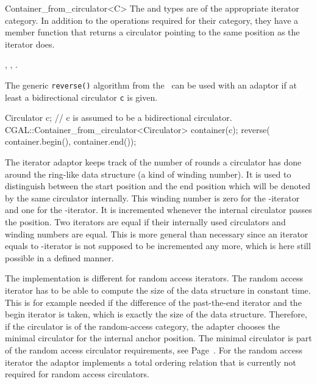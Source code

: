 \begin{ccRefClass}{Container_from_circulator<C>}
The  and  types are of the
appropriate iterator category. In addition to the operations required
for their category, they have a member function
 that returns a circulator pointing to the
same position as the iterator does.

\ccSeeAlso

, 
,
.

\ccExample

The generic {\tt reverse()} algorithm from the \stl\ can be used with an
adaptor if at least a bidirectional circulator {\tt c} is given.

\begin{ccExampleCode}
Circulator c;  // c is assumed to be a bidirectional circulator.
CGAL::Container_from_circulator<Circulator> container(c);
reverse( container.begin(), container.end());
\end{ccExampleCode}

\ccImplementation

The iterator adaptor keeps track of the number of rounds a circulator
has done around the ring-like data structure (a kind of winding
number). It is used to distinguish between the start position and the
end position which will be denoted by the same circulator internally.
This winding number is zero for the -iterator and one
for the -iterator.  It is incremented whenever the
internal circulator passes the  position. Two
iterators are equal if their internally used circulators and winding
numbers are equal. 
This is more general than necessary since an iterator equals to
-iterator is not supposed to be incremented 
 any more, which is here still possible in a defined manner. 

The implementation is different for random access iterators.
The random access iterator has to be able to compute the size of the
data structure in constant time. This is for example needed if the
difference of the past-the-end iterator and the begin iterator is
taken, which is exactly the  size of the data structure.
Therefore, if the circulator is of the random-access category, the
adapter chooses the minimal circulator for the internal anchor
position. The minimal circulator is part of the random access
circulator requirements, see
Page~\pageref{sectionMinCircleRequ}.  For the random
access iterator the adaptor implements a total ordering relation that
is currently not required for random access circulators.

\end{ccRefClass}

